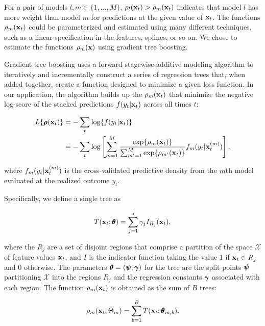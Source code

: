 \documentclass[10pt,letterpaper]{article}
\begin{document}
For a pair of models \(l, m \in \{1, ..., M\}\),
\(\rho_l({\bf x}_t) > \rho_m({\bf x}_t)\) indicates that model \(l\) has more
weight than model \(m\) for predictions at the given value of \({\bf x}_t\).
The functions \(\rho_m({\bf x}_t)\) could be parameterized and estimated
using many different techniques, such as a linear specification in the
features, splines, or so on. We chose to estimate the functions
\(\rho_m({\bf x})\) using gradient tree boosting.

Gradient tree boosting uses a forward stagewise additive modeling
algorithm to iteratively and incrementally construct a series of
regression trees that, when added together, create a function designed
to minimize a given loss function. In our application, the algorithm
builds up the \(\rho_m({\bf x}_t)\) that minimize the negative log-score of
the stacked predictions \(f(y_t|{\bf x}_t)\) across all times \(t\):

\begin{align}
L\{\brho(\bx_t)\} &= - \sum_{t} \log\{f(y_t|\bx_t)\} \nonumber \\
&= - \sum_{t} \log\left[\sum_{m = 1}^M \frac{\exp\{\rho_m(\bx_t)\}}{\sum_{m' = 1}^M \exp\{\rho_{m'}(\bx_t)\}}f_m(y_t|\bx_t^{(m)})\right], \label{eqn:logloss}
\end{align}

where \(f_m(y_t|{\bf x}_t^{(m)})\) is the cross-validated predictive density
from the \(m\)th model evaluated at the realized outcome \(y_t\).

Specifically, we define a single tree as

\begin{equation}
T(\bx_t; \btheta) = \sum_{j=1}^J \gamma_j I_{R_j}(\bx_t),
\end{equation}

where the \(R_j\) are a set of disjoint regions that comprise a
partition of the space \(\mathcal{X}\) of feature values \({\bf x}_t\), and
\(I\) is the indicator function taking the value \(1\) if
\({\bf x}_t \in R_j\) and \(0\) otherwise. The parameters
\(\btheta = (\bpsi, \bgamma)\) for the tree are the split points
\(\bpsi\) partitioning \(\mathcal{X}\) into the regions \(R_j\) and the
regression constants \(\bgamma\) associated with each region. The
function \(\rho_m({\bf x}_t)\) is obtained as the sum of \(B\) trees:

\begin{equation}
\rho_m(\bx_t; \Theta_m) = \sum_{b=1}^B T(\bx_t; \btheta_{m, b}).
\end{equation}
\end{document}
